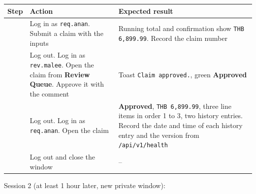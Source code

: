 {\def\LTcaptype{none} %
\begin{longtable}[]{@{}
  >{\raggedright\arraybackslash}p{}
  >{\raggedright\arraybackslash}p{}
  >{\raggedright\arraybackslash}p{}@{}}
\toprule\noalign{}
\begin{minipage}[b]{\linewidth}\raggedright
Step
\end{minipage} & \begin{minipage}[b]{\linewidth}\raggedright
Action
\end{minipage} & \begin{minipage}[b]{\linewidth}\raggedright
Expected result
\end{minipage} \\
\midrule\noalign{}
\endhead
\bottomrule\noalign{}
\endlastfoot
1 & Log in as \texttt{req.anan}. Submit a claim with the inputs & Running total and confirmation show \texttt{THB 6,899.99}. Record the claim number \\
2 & Log out. Log in as \texttt{rev.malee}. Open the claim from \textbf{Review Queue}. Approve it with the comment & Toast \texttt{Claim approved.}, green \textbf{Approved} \\
3 & Log out. Log in as \texttt{req.anan}. Open the claim \shot{} & \textbf{Approved}, \texttt{THB 6,899.99}, three line items in order 1 to 3, two history entries. Record the date and time of each history entry and the version from \texttt{/api/v1/health} \\
4 & Log out and close the window & -- \\
\end{longtable}
}

Session 2 (at least 1 hour later, new private window):

